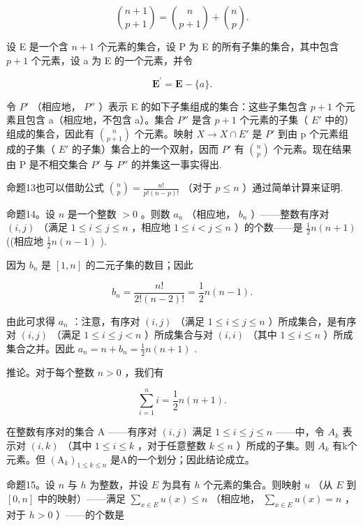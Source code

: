 \[
\binom {n + 1} {p + 1} = \binom {n} {p + 1} + \binom {n} {p}.
\]

设 E 是一个含 \(n + 1\) 个元素的集合，设 P 为 E 的所有子集的集合，其中包含 \(p + 1\) 个元素，设 a 为 E 的一个元素，并令

\[
\mathbf {E} ^ {\prime} = \mathbf {E} - \{a \}.
\]

令 \(P'\) （相应地， \(P''\) ）表示 E 的如下子集组成的集合：这些子集包含 \(p + 1\) 个元素且包含 a（相应地，不包含 a）。集合 \(P''\) 是含 \(p + 1\) 个元素的子集（ \(E'\) 中的）组成的集合，因此有 \(\binom{n}{p+1}\) 个元素。映射 \(X \to X \cap E'\) 是 \(P'\) 到由 p 个元素组成的子集（ \(E'\) 的子集）集合上的一个双射，因而 \(P'\) 有 \(\binom{n}{p}\) 个元素。现在结果由 P 是不相交集合 \(P'\) 与 \(P''\) 的并集这一事实得出.

命题13也可以借助公式 \(\binom{n}{p} = \frac{n!}{p!(n - p)!}\) （对于 \(p \leqslant n\) ）通过简单计算来证明.

命题14。设 \(n\) 是一个整数 \(> 0\) 。则数 \(a_{n}\) （相应地， \(b_{n}\) ）——整数有序对 \((i, j)\) （满足 \(1 \leqslant i \leqslant j \leqslant n\) ，相应地 \(1 \leqslant i < j \leqslant n\) ）的个数——是 \(\frac{1}{2} n(n + 1)\) ((相应地 \(\frac{1}{2} n(n - 1)\) ).

因为 \(b_{n}\) 是 \([1, n]\) 的二元子集的数目；因此

\[
b _ {n} = \frac {n !}{2 ! (n - 2) !} = \frac {1}{2} n (n - 1).
\]

由此可求得 \(a_{n}\) ：注意，有序对 \((i, j)\) （满足 \(1 \leqslant i \leqslant j \leqslant n\) ）所成集合，是有序对 \((i, j)\) （满足 \(1 \leqslant i \leqslant j < n\) ）所成集合与对 \((i, i)\) （其中 \(1 \leqslant i \leqslant n\) ）所成集合之并。因此 \(a_{n} = n + b_{n} = \frac{1}{2} n(n + 1)\) .

推论。对于每个整数 \(n > 0\) ，我们有

\[
\sum_ {i = 1} ^ {n} i = \frac {1}{2} n (n + 1).
\]

在整数有序对的集合 A ——有序对 \((i, j)\) 满足 \(1 \leqslant i \leqslant j \leqslant n\) ——中，令 \(A_{k}\) 表示对 \((i, k)\) （其中 \(1 \leqslant i \leqslant k\) ，对于任意整数 \(k \leqslant n\) ）所成的子集。则 \(A_{k}\) 有k个元素。但 \((\mathrm{A}_{k})_{1 \leqslant k \leqslant n}\) 是A的一个划分；因此结论成立。

命题15。设 \(n\) 与 \(h\) 为整数，并设 \(E\) 为具有 \(h\) 个元素的集合。则映射 \(u\) （从 \(E\) 到 \([0, n]\) 中的映射）——满足 \(\sum_{x \in E} u(x) \leqslant n\) （相应地， \(\sum_{x \in E} u(x) = n\) ，对于 \(h > 0\) ）——的个数是

